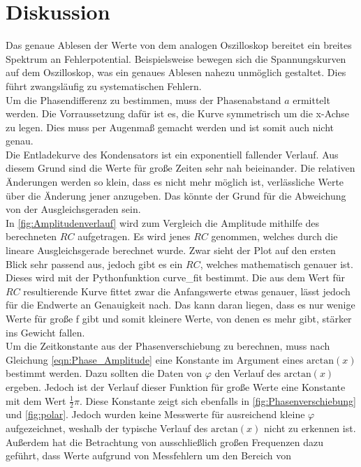 %

%
\section{Diskussion}

Das genaue Ablesen der Werte von dem analogen Oszilloskop bereitet ein breites Spektrum an Fehlerpotential. Beispielsweise
bewegen sich die Spannungskurven auf dem Oszilloskop, was ein genaues Ablesen nahezu unmöglich gestaltet. Dies führt
zwangsläufig zu systematischen Fehlern. 
\\
Um die Phasendifferenz zu bestimmen, muss der Phasenabstand $a$ ermittelt werden. Die Vorraussetzung dafür ist es, die 
Kurve symmetrisch um die x-Achse zu legen. Dies muss per Augenmaß gemacht werden und ist somit auch nicht genau.
\\
Die Entladekurve des Kondensators ist ein exponentiell fallender Verlauf. Aus diesem Grund sind die Werte für große Zeiten 
sehr nah beieinander. Die relativen Änderungen werden so klein, dass es nicht mehr möglich ist, verlässliche Werte über die 
Änderung jener anzugeben. Das könnte der Grund für die Abweichung von der Ausgleichsgeraden sein.
\\
In \autoref{fig:Amplitudenverlauf} wird zum Vergleich die Amplitude mithilfe des berechneten $RC$ aufgetragen. 
Es wird jenes $RC$ genommen, welches durch die lineare Ausgleichsgerade berechnet wurde. Zwar sieht der Plot auf den ersten Blick 
sehr passend aus, jedoch gibt es ein $RC$, welches mathematisch genauer ist. Dieses wird mit der Pythonfunktion curve\_fit 
bestimmt. Die aus dem Wert für $RC$ resultierende Kurve fittet zwar die Anfangswerte etwas genauer, lässt jedoch für die Endwerte an 
Genauigkeit nach. Das kann daran liegen, dass es nur wenige Werte für große f gibt und somit kleinere Werte, von denen es 
mehr gibt, stärker ins Gewicht fallen. 
\\
Um die Zeitkonstante aus der Phasenverschiebung zu berechnen, muss nach Gleichung \eqref{eqn:Phase_Amplitude} eine Konstante 
im Argument eines $\text{arctan}(x)$ bestimmt werden. Dazu sollten die Daten von $\varphi$ den Verlauf des 
$\text{arctan}(x)$ ergeben. Jedoch ist der Verlauf dieser Funktion für große Werte eine Konstante mit dem Wert $\frac{1}{2} \pi$.
Diese Konstante zeigt sich ebenfalls in \ref{fig:Phasenverschiebung} und \ref{fig:polar}. 
Jedoch wurden keine Messwerte für ausreichend kleine $\varphi$ aufgezeichnet, weshalb der typische Verlauf des $\text{arctan}(x)$
nicht zu erkennen ist. Außerdem hat die Betrachtung von ausschließlich  großen Frequenzen dazu geführt, dass Werte aufgrund von Messfehlern um den Bereich von 
